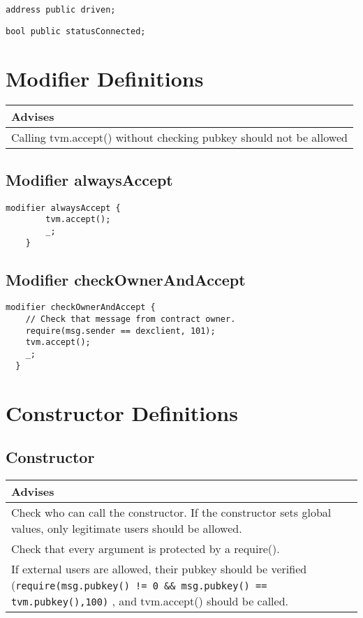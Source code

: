\begin{lstlisting}[firstnumber=23]
  address public driven;
\end{lstlisting}

\begin{lstlisting}[firstnumber=24]
  bool public statusConnected;
\end{lstlisting}

\section{Modifier Definitions}


\ifsoldraft
\noindent\begin{tabular}{|p{12cm}|}\hline
\rowcolor{green}Advises
\\\hline
Calling tvm.accept() without checking pubkey should not be allowed
\\\hline\end{tabular}
\fi

\subsection{Modifier alwaysAccept}


\begin{lstlisting}[firstnumber=27]
	modifier alwaysAccept {
		tvm.accept();
		_;
	}
\end{lstlisting}

\subsection{Modifier checkOwnerAndAccept}


\begin{lstlisting}[firstnumber=32]
  modifier checkOwnerAndAccept {
    // Check that message from contract owner.
    require(msg.sender == dexclient, 101);
    tvm.accept();
    _;
  }
\end{lstlisting}

\section{Constructor Definitions}


\subsection{Constructor}

\ifsoldraft
\noindent\begin{tabular}{|p{12cm}|}\hline
\rowcolor{green}Advises
\\\hline
Check who can call the constructor. If the constructor sets global values, only legitimate users should be allowed.
\\\hline
Check that every argument is protected by a require().
\\\hline
If external users are allowed, their pubkey should be verified (\verb+require(msg.pubkey() != 0 && msg.pubkey() == tvm.pubkey(),100)+ , and tvm.accept() should be called.
\\\hline\end{tabular}
\fi

